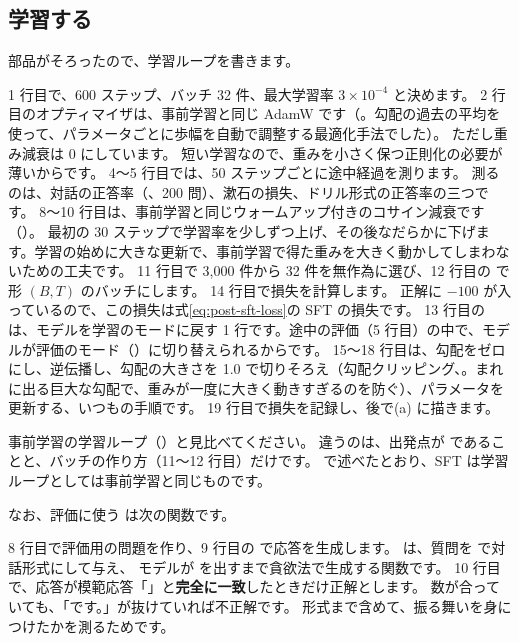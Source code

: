 \subsection{学習する}

部品がそろったので、学習ループを書きます。


1 行目で、600 ステップ、バッチ 32 件、最大学習率 $3\times10^{-4}$ と決めます。
2 行目のオプティマイザは、事前学習と同じ AdamW です（。勾配の過去の平均を使って、パラメータごとに歩幅を自動で調整する最適化手法でした）。
ただし重み減衰は 0 にしています。
短い学習なので、重みを小さく保つ正則化の必要が薄いからです。
4〜5 行目では、50 ステップごとに途中経過を測ります。
測るのは、対話の正答率（、200 問）、漱石の損失、ドリル形式の正答率の三つです。
8〜10 行目は、事前学習と同じウォームアップ付きのコサイン減衰です（）。
最初の 30 ステップで学習率を少しずつ上げ、その後なだらかに下げます。学習の始めに大きな更新で、事前学習で得た重みを大きく動かしてしまわないための工夫です。
11 行目で 3,000 件から 32 件を無作為に選び、12 行目の  で形 $(B, T)$ のバッチにします。
14 行目で損失を計算します。
正解に $-100$ が入っているので、この損失は式\eqref{eq:post-sft-loss}の SFT の損失です。
13 行目の  は、モデルを学習のモードに戻す 1 行です。途中の評価（5 行目）の中で、モデルが評価のモード（）に切り替えられるからです。
15〜18 行目は、勾配をゼロにし、逆伝播し、勾配の大きさを 1.0 で切りそろえ（勾配クリッピング、。まれに出る巨大な勾配で、重みが一度に大きく動きすぎるのを防ぐ）、パラメータを更新する、いつもの手順です。
19 行目で損失を記録し、後で(a) に描きます。

事前学習の学習ループ（）と見比べてください。
違うのは、出発点が  であることと、バッチの作り方（11〜12 行目）だけです。
で述べたとおり、SFT は学習ループとしては事前学習と同じものです。

なお、評価に使う  は次の関数です。


8 行目で評価用の問題を作り、9 行目の  で応答を生成します。
 は、質問を  で対話形式にして与え、
モデルが  を出すまで貪欲法で生成する関数です。
10 行目で、応答が模範応答「」と\textbf{完全に一致}したときだけ正解とします。
数が合っていても、「です。」が抜けていれば不正解です。
形式まで含めて、振る舞いを身につけたかを測るためです。

